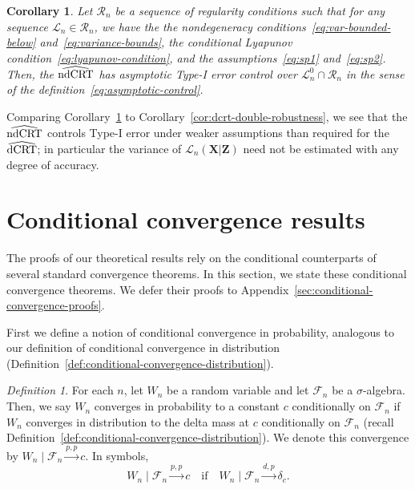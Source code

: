 \documentclass[aos]{imsart}
\theoremstyle{plain}
\newtheorem{corollary}{Corollary}
\theoremstyle{remark}
\newtheorem{definition}{Definition}
\newcommand{\prx}{\bm X}								%
\newcommand{\prz}{\bm Z}								%
\newcommand{\law}{\mathcal L}							%
\newcommand{\nulllaws}{\mathscr L^0}					%
\newcommand{\regclass}{\mathscr R}					    %
\newcommand{\dCRThat}{\widehat{\textnormal{dCRT}}}		%
\newcommand{\ndCRThat}{\widehat{\textnormal{ndCRT}}}	%
\newcommand{\convdp}{\overset {d,p} \longrightarrow}    %
\newcommand{\convpp}{\overset {p,p} \longrightarrow}    %
\begin{document}
\begin{corollary}
\label{cor:double-robustness-ndcrt}
Let $\regclass_n$ be a sequence of regularity conditions such that for any sequence $\law_n \in \regclass_n$, we have the the nondegeneracy conditions~\eqref{eq:var-bounded-below} and~\eqref{eq:variance-bounds}, the conditional Lyapunov condition~\eqref{eq:lyapunov-condition}, and the assumptions~\eqref{eq:sp1} and~\eqref{eq:sp2}. Then, the $\ndCRThat$ has asymptotic Type-I error control over $\nulllaws_n \cap \regclass_n$ in the sense of the definition~\eqref{eq:asymptotic-control}.
\end{corollary}
Comparing Corollary~\ref{cor:double-robustness-ndcrt} to Corollary~\ref{cor:dcrt-double-robustness}, we see that the $\ndCRThat$ controls Type-I error under weaker assumptions than required for the $\dCRThat$; in particular the variance of $\law_n(\prx|\prz)$ need not be estimated with any degree of accuracy.


\section{Conditional convergence results} \label{sec:conditional-convergence-results}

The proofs of our theoretical results rely on the conditional counterparts of several standard convergence theorems. In this section, we state these conditional convergence theorems. We defer their proofs to Appendix~\ref{sec:conditional-convergence-proofs}.

First we define a notion of conditional convergence in probability, analogous to our definition of conditional convergence in distribution (Definition~\ref{def:conditional-convergence-distribution}).

\begin{definition} \label{def:conditional-convergence-probability}
	For each $n$, let $W_n$ be a random variable and let $\mathcal F_n$ be a $\sigma$-algebra. Then, we say $W_n$ converges in probability to a constant $c$ conditionally on $\mathcal F_n$ if $W_n$ converges in distribution to the delta mass at $c$ conditionally on $\mathcal F_n$ (recall Definition~\ref{def:conditional-convergence-distribution}). We denote this convergence by ${W_n \mid \mathcal F_n \convpp c}$. In symbols, 
	\begin{equation}
		W_n \mid \mathcal F_n \convpp c \quad \text{if} \quad W_n \mid \mathcal F_n \convdp \delta_c.
	\end{equation}
\end{definition}
\end{document}
